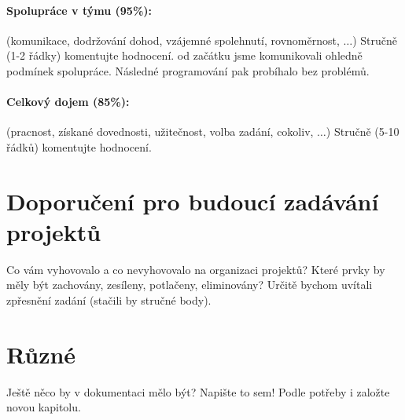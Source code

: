 \documentclass[11pt,a4paper]{article}
\begin{document}
\paragraph{Spolupráce v týmu (95\%):} (komunikace, dodržování dohod, vzájemné
spolehnutí, rovnoměrnost, $\ldots$)
Stručně (1-2 řádky) komentujte hodnocení. 
od začátku jsme komunikovali ohledně podmínek spolupráce. Následné programování pak probíhalo bez problémů.

\paragraph{Celkový dojem (85\%):} (pracnost, získané dovednosti, užitečnost,
volba zadání, cokoliv, $\ldots$)
Stručně (5-10 řádků) komentujte hodnocení. 

\section{Doporučení pro budoucí zadávání projektů}

Co vám vyhovovalo a co nevyhovovalo na organizaci projektů? Které prvky by měly
být zachovány, zesíleny, potlačeny, eliminovány?
Určitě bychom uvítali zpřesnění zadání (stačili by stručné body).

\section{Různé}

Ještě něco by v dokumentaci mělo být? Napište to sem! Podle potřeby i založte
novou kapitolu.
\end{document}
